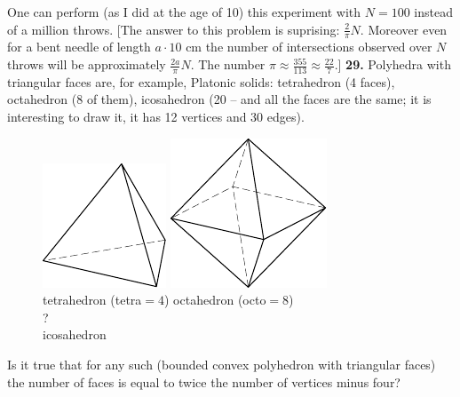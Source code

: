 \documentclass[12pt]{article}  %
\begin{document}
One can perform (as I did at the age of 10) this experiment with $N=100$ instead of a million throws.
[The answer to this problem is suprising: $\frac2{\pi}N$. Moreover even for a bent needle of length $a \cdot 10$
cm the number of intersections observed over $N$ throws will be approximately $\frac{2a}{\pi}N$. 
The number $\pi \approx  \frac{355}{113} \approx \frac{22}7.$]
\newline\newline\quad
{\bf 29.} Polyhedra with triangular faces are, for example, Platonic solids: tetrahedron (4 faces),
octahedron (8 of them), icosahedron (20 -- and all the faces are the same; it is interesting to draw it,
it has 12 vertices and 30 edges).
\begin{figure}[h!]
\centering
\footnotesize
\hspace{5pt}
\includegraphics[scale=1]{taskbook-131}\hspace{68pt}
\includegraphics[scale=1]{taskbook-132}\\ \vspace{3pt}
tetrahedron (tetra${}= 4$) \hspace{40pt}
octahedron (octo${}= 8$)\\[25pt]
{\Huge 
?}\\ icosahedron\vspace{3pt}
\end{figure}

Is it true that for any such (bounded convex polyhedron with triangular faces) the number of faces is
equal to twice the number of vertices minus four?
\end{document}
